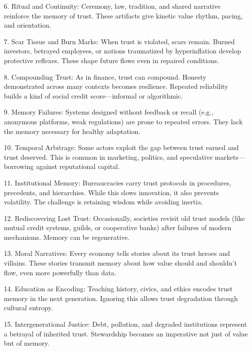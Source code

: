 \documentclass[11pt,oneside]{book}
\begin{document}
6. Ritual and Continuity: Ceremony, law, tradition, and shared narrative reinforce the memory of trust. These artifacts give kinetic value rhythm, pacing, and orientation.



7. Scar Tissue and Burn Marks: When trust is violated, scars remain. Burned investors, betrayed employees, or nations traumatized by hyperinflation develop protective reflexes. These shape future flows even in repaired conditions.



8. Compounding Trust: As in finance, trust can compound. Honesty demonstrated across many contexts becomes resilience. Repeated reliability builds a kind of social credit score—informal or algorithmic.



9. Memory Failures: Systems designed without feedback or recall (e.g., anonymous platforms, weak regulations) are prone to repeated errors. They lack the memory necessary for healthy adaptation.



10. Temporal Arbitrage: Some actors exploit the gap between trust earned and trust deserved. This is common in marketing, politics, and speculative markets—borrowing against reputational capital.



11. Institutional Memory: Bureaucracies carry trust protocols in procedures, precedents, and hierarchies. While this slows innovation, it also prevents volatility. The challenge is retaining wisdom while avoiding inertia.



12. Rediscovering Lost Trust: Occasionally, societies revisit old trust models (like mutual credit systems, guilds, or cooperative banks) after failures of modern mechanisms. Memory can be regenerative.



13. Moral Narratives: Every economy tells stories about its trust heroes and villains. These stories transmit memory about how value should and shouldn’t flow, even more powerfully than data.



14. Education as Encoding: Teaching history, civics, and ethics encodes trust memory in the next generation. Ignoring this allows trust degradation through cultural entropy.



15. Intergenerational Justice: Debt, pollution, and degraded institutions represent a betrayal of inherited trust. Stewardship becomes an imperative not just of value but of memory.
\end{document}
